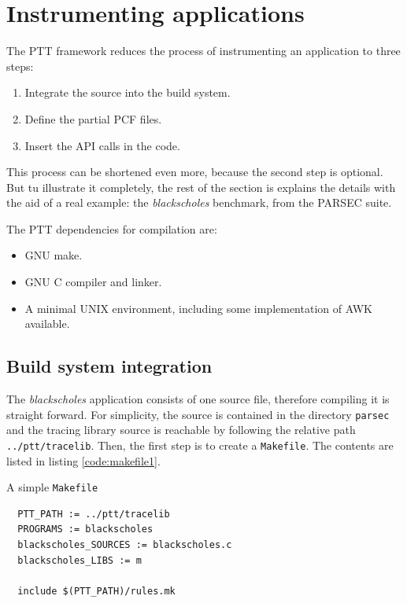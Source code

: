 \section{Instrumenting applications}
\label{sec:applications}

The PTT framework reduces the process of instrumenting an application to three
steps:

\begin{enumerate}
\item Integrate the source into the build system.
\item Define the partial PCF files.
\item Insert the API calls in the code.
\end{enumerate}

This process can be shortened even more, because the second step is optional.
But tu illustrate it completely, the rest of the section is explains the details
with the aid of a real example: the \emph{blackscholes} benchmark, from the
PARSEC suite.

The PTT dependencies for compilation are:

\begin{itemize}
\item GNU make.
\item GNU C compiler and linker.
\item A minimal UNIX environment, including some implementation of AWK
available.
\end{itemize}


\subsection{Build system integration}

The \emph{blackscholes} application consists of one source file, therefore
compiling it is straight forward.  For simplicity, the source is contained in
the directory \verb:parsec: and the tracing library source is reachable by
following the relative path \verb:../ptt/tracelib:.  Then, the first step is to
create a \verb:Makefile:.  The contents are listed in listing
\ref{code:makefile1}.

\begin{listing}
\label{code:makefile1}
\caption{A simple \texttt{Makefile}}
\begin{verbatim}
  PTT_PATH := ../ptt/tracelib
  PROGRAMS := blackscholes
  blackscholes_SOURCES := blackscholes.c
  blackscholes_LIBS := m

  include $(PTT_PATH)/rules.mk
\end{verbatim}
\end{listing}

